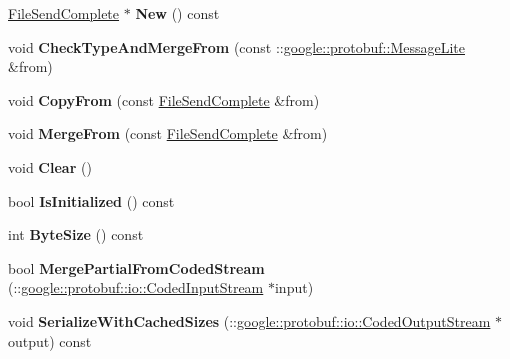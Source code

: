\begin{DoxyCompactItemize}
\hyperlink{classruntime_1_1FileSendComplete}{File\+Send\+Complete} $\ast$ {\bfseries New} () const
\item 
\mbox{\label{classruntime_1_1FileSendComplete_ade3f5a821342fc8a6a5f6a9e344433dc}} 
void {\bfseries Check\+Type\+And\+Merge\+From} (const \+::\hyperlink{classgoogle_1_1protobuf_1_1MessageLite}{google\+::protobuf\+::\+Message\+Lite} \&from)
\item 
\mbox{\label{classruntime_1_1FileSendComplete_a611db0e48f55dd4ccbd1698b55965903}} 
void {\bfseries Copy\+From} (const \hyperlink{classruntime_1_1FileSendComplete}{File\+Send\+Complete} \&from)
\item 
\mbox{\label{classruntime_1_1FileSendComplete_a9cd7b59331751382d2fbf9820019adfb}} 
void {\bfseries Merge\+From} (const \hyperlink{classruntime_1_1FileSendComplete}{File\+Send\+Complete} \&from)
\item 
\mbox{\label{classruntime_1_1FileSendComplete_aa4c6920d1122a7e35d5acfa27dbf471d}} 
void {\bfseries Clear} ()
\item 
\mbox{\label{classruntime_1_1FileSendComplete_a31dc45bc274d96a0aa7cd21b8eb2ac22}} 
bool {\bfseries Is\+Initialized} () const
\item 
\mbox{\label{classruntime_1_1FileSendComplete_a48c6e880500e0e4cec186c8f3e306ef7}} 
int {\bfseries Byte\+Size} () const
\item 
\mbox{\label{classruntime_1_1FileSendComplete_a55cd989a695b9f8e29b6eeb7172e4264}} 
bool {\bfseries Merge\+Partial\+From\+Coded\+Stream} (\+::\hyperlink{classgoogle_1_1protobuf_1_1io_1_1CodedInputStream}{google\+::protobuf\+::io\+::\+Coded\+Input\+Stream} $\ast$input)
\item 
\mbox{\label{classruntime_1_1FileSendComplete_ae2e1d0c6a3a2a214683bc391da55deea}} 
void {\bfseries Serialize\+With\+Cached\+Sizes} (\+::\hyperlink{classgoogle_1_1protobuf_1_1io_1_1CodedOutputStream}{google\+::protobuf\+::io\+::\+Coded\+Output\+Stream} $\ast$output) const

\end{DoxyCompactItemize}
